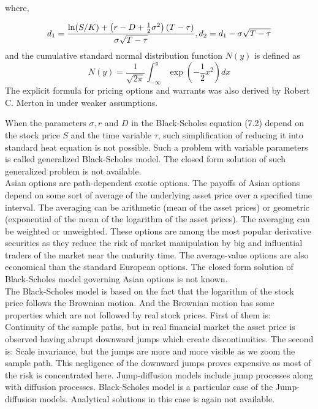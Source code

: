 \documentclass[12pt, a4paper]{report}
\begin{document}
where,

\begin{equation}
     d_{1} = \frac{\ln(S/K) + \left(r - D + \frac{1}{2} \sigma^{2}\right)(T - \tau)}{\sigma \sqrt{T - \tau}}, \\
     d_{2} = d_{1} - \sigma \sqrt{T - \tau}\\
\end{equation} 
and the cumulative standard normal distribution function $N(y)$ is defined as 
\begin{equation}
N(y)=\frac{1}{\sqrt{2 \pi}} \int_{-\infty}^{y} \exp \left(-\frac{1}{2} x^{2}\right) d x
\end{equation}
The explicit formula for pricing options and warrants was also derived by Robert C. Merton in  under weaker assumptions.

When the parameters $\sigma, r$ and $D$ in the Black-Scholes equation (7.2) depend on the  stock price $S$ and the time variable $\tau$, such simplification of reducing it into standard  heat equation is not possible. Such a problem with variable parameters is called generalized Black-Scholes model. The closed form solution of such generalized problem is not available.\\

Asian options are path-dependent exotic options. The payoffs of Asian options depend on some sort of average of the underlying asset price over a specified time interval. The averaging can be arithmetic (mean of the asset prices) or geometric (exponential of the mean of the logarithm of the asset prices). The averaging can be weighted or unweighted. These options are among the most popular derivative securities as they reduce the risk of market manipulation by big and influential traders of the market near the maturity time. The average-value options are also economical than the standard European options. The closed form solution of Black-Scholes model governing Asian options is not known.\\

The Black-Scholes model is based on the fact that the logarithm of the stock price follows the Brownian motion. And the Brownian motion has some properties which are not followed by real stock prices. First of them is: Continuity of the sample paths, but in real financial market the asset price is observed having abrupt downward jumps which create discontinuities. The second is: Scale invariance, but the jumps are more and more visible as we zoom the sample path. This negligence of the downward jumps proves expensive as most of the risk is concentrated here. Jump-diffusion models include jump processes along with diffusion processes. Black-Scholes model is a particular case of the Jump-diffusion models. Analytical solutions in this case is again not available.\\
\end{document}
